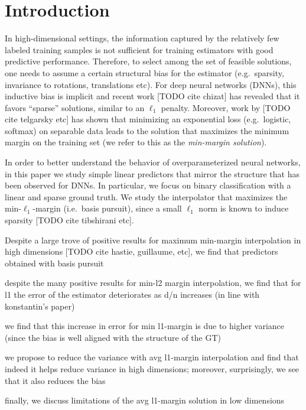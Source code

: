 \section{Introduction}

In high-dimensional settings, the information captured by the relatively few
labeled training samples is not sufficient for training estimators with good
predictive performance. Therefore, to select among the set of feasible
solutions, one needs to assume a certain structural bias for the estimator
(e.g.\ sparsity, invariance to rotations, translations etc).
For deep neural networks (DNNs), this inductive bias is implicit and recent work [TODO
cite chizat] has revealed that it favors ``sparse'' solutions, similar to an
$\ell_1$ penalty. Moreover, work by [TODO cite telgarsky etc] has shown that
minimizing an exponential loss (e.g.\ logistic, softmax) on separable data leads
to the solution that maximizes the minimum margin on the training set (we refer
to this as the \emph{min-margin solution}).

In order to better understand the behavior of overparameterized neural networks,
in this paper we study simple linear predictors that mirror the structure that
has been observed for DNNs. In particular, we focus on binary classification
with a linear and sparse ground truth. We study the interpolator that maximizes
the min-$\ell_1$-margin (i.e.\ basis pursuit), since a small $\ell_1$ norm is
known to induce sparsity [TODO cite tibshirani etc].

Despite a large trove of positive results for maximum min-margin interpolation
in high dimensions [TODO cite hastie, guillaume, etc], we find that predictors
obtained with basis pursuit 

despite the many positive results for min-l2 margin interpolation, we find that for l1 the error of the estimator deteriorates as d/n increases (in line with konstantin’s paper)

we find that this increase in error for min l1-margin is due to higher variance (since the bias is well aligned with the structure of the GT)

we propose to reduce the variance with avg l1-margin interpolation and find that
indeed it helps reduce variance in high dimensions; moreover, surprisingly, we
see that it also reduces the bias

finally, we discuss limitations of the avg l1-margin solution in low dimensions



